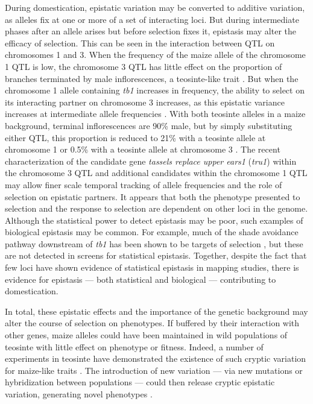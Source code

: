 \documentclass[9pt,twocolumn,twoside]{rilabRxiv}
\newcommand{\jri}[1]{{\small \textcolor{red}{#1}}}
\begin{document}
﻿During domestication, epistatic variation may be converted to additive variation, as alleles fix at one or more of a set of interacting loci.
But during intermediate phases after an allele arises but before selection fixes it, epistasis may alter the efficacy of selection.
This can be seen in the interaction between QTL on chromosomes 1 and 3.
When the frequency of the maize allele of the chromosome 1 QTL is low, the chromosome 3 QTL has little effect on the proportion of branches terminated by male inflorescences, a teosinte-like trait \citep{doebley1995}.
But when the chromosome 1 allele containing \textit{tb1} increases in frequency, the ability to select on its interacting partner on chromosome 3 increases, as this epistatic variance increases at intermediate allele frequencies \citep{goodnight2004}.
With both teosinte alleles in a maize background, terminal inflorescences are 90\% male, but by simply substituting either QTL, this proportion is reduced to 21\% with a teosinte allele at chromosome 1 or 0.5\% with a teosinte allele at chromosome 3 \citep{lukens1999}.
﻿The recent characterization of the candidate gene \textit{tassels replace upper ears1} (\textit{tru1}) within the chromosome 3 QTL \citep{dong2017} and additional candidates within the chromosome 1 QTL \citep{yang2016} may allow finer scale temporal tracking of allele frequencies and the role of selection on epistatic partners.%
﻿It appears that both the phenotype presented to selection and the response to selection are dependent on other loci in the genome.
﻿Although the statistical power to detect epistasis may be poor, such examples of biological epistasis may be common.
For example, much of the shade avoidance pathway downstream of \textit{tb1} has been shown to be targets of selection \citep{studer2017}, but these are not detected in screens for statistical epistasis. 
Together, despite the fact that few loci have shown evidence of statistical epistasis in mapping studies, there is evidence for epistasis --- both statistical and biological --- contributing to domestication.


﻿In total, these epistatic effects and the importance of the genetic background may alter the course of selection on phenotypes.
If buffered by their interaction with other genes, maize alleles could have been maintained in wild populations of teosinte with little effect on phenotype or fitness.
Indeed, a number of experiments in teosinte have demonstrated the existence of such cryptic variation for maize-like traits \citep{lauter2002, weber2007, weber2008, vann2015}.
The introduction of new variation --- via new mutations or hybridization between populations --- could then release cryptic epistatic variation, generating novel phenotypes \citep{doebley1995}.
\end{document}
